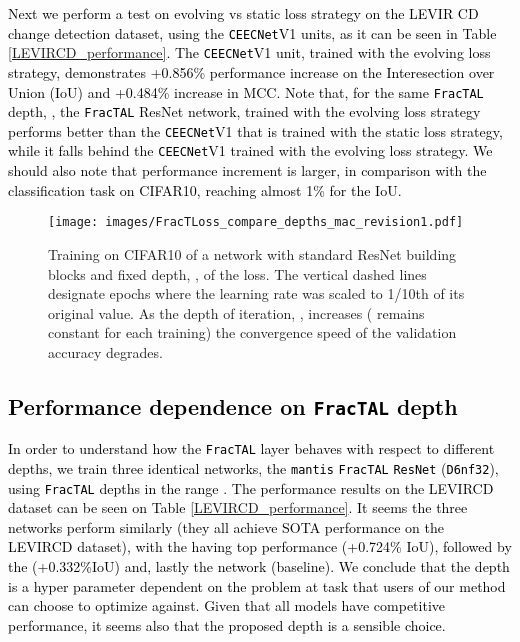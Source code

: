 \documentclass[times, 5p]{elsarticle}
\def \FracTAL {\texttt{FracTAL} }
\newcommand{\ceecnet}{\texttt{CEECNet}}
\newcommand{\mantis}{\texttt{mantis}}
\begin{document}
\textcolor{black}{Next we perform a test on evolving vs static loss strategy on the LEVIR CD change detection dataset, using the \ceecnet V1 units, as it can be seen in Table \ref{LEVIRCD_performance}. The \ceecnet V1 unit, trained with the evolving loss strategy, demonstrates +0.856\% performance increase on the Interesection over Union (IoU) and +0.484\% increase in MCC. 
Note that, for the same \FracTAL depth, , the \FracTAL ResNet network, trained with the evolving loss strategy performs better than the \ceecnet V1 that is trained with the static loss strategy, while it falls behind the \ceecnet V1 trained with the evolving loss strategy. We should also note that performance increment is larger, in comparison with the classification task on \textsc{CIFAR10}, reaching almost 1\% for the IoU.}



\begin{figure}
\centering
\texttt{[image: images/FracTLoss\_compare\_depths\_mac\_revision1.pdf]}
\caption{Training on CIFAR10 of a network with standard ResNet building blocks and fixed depth, , of the   loss. The vertical dashed lines designate epochs where the learning rate was scaled to 1/10th of its original value. As the depth of iteration, , increases ( remains constant for each training)  the convergence speed of the validation accuracy degrades.} 
\label{cifar10_ft_start_rand}
\end{figure}


\subsection{\textcolor{black}{Performance dependence on \FracTAL depth}}

\textcolor{black}{
In order to understand how the \FracTAL layer behaves with respect to different depths, we train three identical networks, the \mantis{} \FracTAL \texttt{ResNet} (\texttt{D6nf32}), using \FracTAL depths in the range . The performance results on the LEVIRCD dataset can be seen on Table \ref{LEVIRCD_performance}. It seems the three networks perform similarly (they all achieve SOTA performance on the LEVIRCD dataset), with the  having top performance (+0.724\% IoU), followed by the  (+0.332\%IoU) and, lastly the  network 
(baseline). We conclude that the depth  is a hyper parameter dependent on the problem at task that users of our method can choose to optimize against. Given that all models have competitive performance, it seems also that the proposed depth  is a sensible choice. } 
\end{document}
